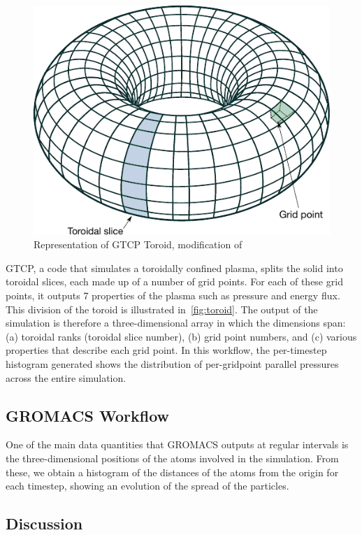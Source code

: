\begin{figure}
  \centering
  \vspace{-0.10in}
  \includegraphics[width=0.7\columnwidth]{fig/Simple_Torus_mod}
  \vspace{-0.09in}
  \caption{Representation of GTCP Toroid, modification of \cite{WikimediaCommons:torus}}
  \label{fig:toroid}
  \vspace{-0.20in}
\end{figure}

GTCP, a code that simulates a toroidally confined plasma, splits the solid into
toroidal slices, each made up of a number of grid points. For each of these
grid points, it outputs 7 properties of the plasma such as pressure and energy
flux. This division of the toroid is illustrated in~\autoref{fig:toroid}.
The output of the simulation is therefore a three-dimensional array in which
the dimensions span: (a) toroidal ranks (toroidal slice number), (b) grid point
numbers, and (c) various properties that describe each grid point.
In this workflow, the per-timestep histogram
generated shows the distribution of per-gridpoint parallel pressures across
the entire simulation.

\subsection{GROMACS Workflow}

One of the main data quantities that GROMACS outputs
at regular intervals is the three-dimensional positions
of the atoms involved in the simulation.
From these, we obtain a histogram of the distances
of the atoms from the origin for each timestep, showing
an evolution of the spread of the particles.

\subsection{Discussion}

